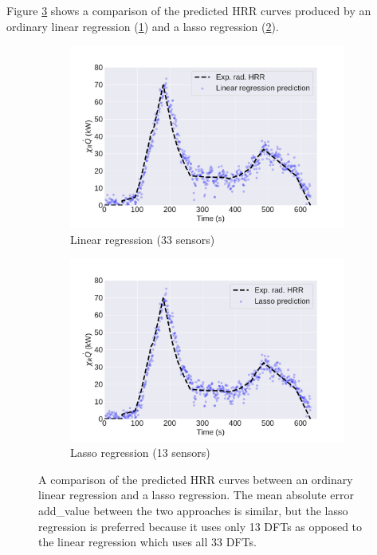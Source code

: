 \documentclass{article}
\begin{document}
Figure \ref{fig:dft_regressions} shows a comparison of the predicted HRR curves produced by an ordinary linear regression (\ref{fig:linreg_rad}) and a lasso regression (\ref{fig:lasso_rad}).

\begin{figure}[htbp]
  \centering
  \begin{subfigure}[t]{.45\textwidth}
      \centering
      \includegraphics[width=\textwidth,keepaspectratio]{figures/linreg_rad.pdf}
      \caption{Linear regression (33 sensors)}
      \label{fig:linreg_rad}
  \end{subfigure}
  \begin{subfigure}[t]{.45\textwidth}
      \centering
      \includegraphics[width=\textwidth ,keepaspectratio]{figures/lasso_rad.pdf}
      \caption{Lasso regression (13 sensors)}
      \label{fig:lasso_rad}
  \end{subfigure}
  \caption{A comparison of the predicted HRR curves between an ordinary linear regression and a lasso regression. The mean absolute error add_value between the two approaches is similar, but the lasso regression is preferred because it uses only 13 DFTs as opposed to the linear regression which uses all 33 DFTs. } 
  \label{fig:dft_regressions}
\end{figure}
\end{document}
